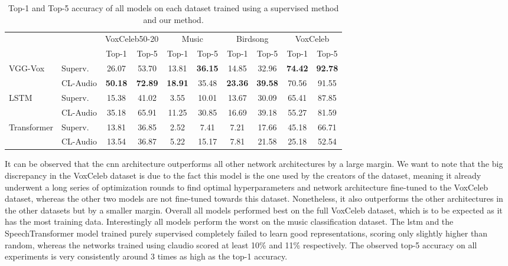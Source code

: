 \begin{table}[htpb]
  \centering
  \begin{tabular}{l l c c c c c c c c}
    \toprule
       & & \multicolumn{2}{c}{VoxCeleb50-20} & \multicolumn{2}{c}{Music} & \multicolumn{2}{c}{Birdsong} & \multicolumn{2}{c}{VoxCeleb} \\
       \cmidrule(lr){3-4}
       \cmidrule(lr){5-6}
       \cmidrule(lr){7-8}
        \cmidrule(lr){9-10}
        & & Top-1 & Top-5 & Top-1 & Top-5 & Top-1 & Top-5 & Top-1 & Top-5 \\
        \midrule
        \multirow{2}{*}{VGG-Vox} & Superv. & 26.07 & 53.70 & 13.81 & \textbf{36.15} & 14.85 & 32.96 & \textbf{74.42} & \textbf{92.78} \\ 
        & CL-Audio & \textbf{50.18} & \textbf{72.89} & \textbf{18.91} & 35.48 & \textbf{23.36} & \textbf{39.58} & 70.56 & 91.55 \\
        \midrule
        \multirow{2}{*}{LSTM} & Superv. & 15.38 & 41.02 & 3.55 & 10.01 & 13.67 & 30.09 & 65.41 & 87.85 \\
        & CL-Audio & 35.18 & 65.91 & 11.25 & 30.85 & 16.69 & 39.18 & 55.27 & 81.59 \\
        \midrule
        \multirow{2}{*}{Transformer} & Superv. & 13.81 & 36.85 & 2.52 & 7.41 & 7.21 & 17.66 & 45.18 & 66.71 \\ 
        & CL-Audio & 13.54 & 36.87 & 5.22 & 15.17 & 7.81 & 21.58 & 25.18 & 52.54 \\ 
    \bottomrule
  \end{tabular}
  \caption[Model comparison results]{Top-1 and Top-5 accuracy of all models on each dataset trained using a supervised method and our method.}\label{tab:model_comparison}
\end{table}

It can be observed that the \gls{cnn} architecture outperforms all other network architectures by a large margin. We want to note that the big discrepancy in the VoxCeleb dataset is due to the fact this model is the one used by the creators of the dataset, meaning it already underwent a long series of optimization rounds to find optimal hyperparameters and network architecture fine-tuned to the VoxCeleb dataset, whereas the other two models are not fine-tuned towards this dataset. Nonetheless, it also outperforms the other architectures in the other datasets but by a smaller margin. Overall all models performed best on the full VoxCeleb dataset, which is to be expected as it has the most training data. Interestingly all models perform the worst on the music classification dataset. The \gls{lstm} and the SpeechTransformer model trained purely supervised completely failed to learn good representations, scoring only slightly higher than random, whereas the networks trained using \gls{claudio} scored at least 10\% and 11\% respectively. The observed top-5 accuracy on all experiments is very consistently around 3 times as high as the top-1 accuracy.

